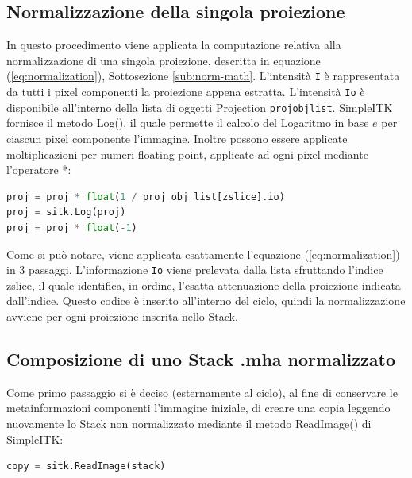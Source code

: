 \documentclass[a4paper,12pt, doubleside]{report}
\begin{document}
                
            \subsection{Normalizzazione della singola proiezione}
                \par
                    In questo procedimento viene applicata la computazione relativa alla normalizzazione di una singola proiezione, descritta in equazione (\ref{eq:normalization}), Sottosezione \ref{sub:norm-math}.
                    L'intensità \texttt{I} è rappresentata da tutti i pixel componenti la proiezione appena estratta. L'intensità \texttt{Io} è disponibile all'interno della lista di oggetti Projection \texttt{proj\textunderscore obj\textunderscore list}. SimpleITK fornisce il metodo Log()\cite{sitk-log}, il quale permette il calcolo del Logaritmo in base $e$ per ciascun pixel componente l'immagine. Inoltre possono essere applicate moltiplicazioni per numeri floating point, applicate ad ogni pixel mediante l'operatore *:
                    \begin{lstlisting}[language=python, frame=bt]
proj = proj * float(1 / proj_obj_list[zslice].io)
proj = sitk.Log(proj)
proj = proj * float(-1)
                    \end{lstlisting} 
                    
                    Come si può notare, viene applicata esattamente l'equazione (\ref{eq:normalization}) in 3 passaggi. L'informazione \texttt{Io} viene prelevata dalla lista sfruttando l'indice zslice, il quale identifica, in ordine, l'esatta attenuazione della proiezione indicata dall'indice. Questo codice è inserito all'interno del ciclo, quindi la normalizzazione avviene per ogni proiezione inserita nello Stack.
                             
            \subsection{Composizione di uno Stack .mha normalizzato}
                \par
                    Come primo passaggio si è deciso (esternamente al ciclo), al fine di conservare le metainformazioni componenti l'immagine iniziale, di creare una copia leggendo nuovamente lo Stack non normalizzato mediante il metodo ReadImage() di SimpleITK:
                   
                    \begin{lstlisting}[language=python, frame=bt]
copy = sitk.ReadImage(stack)
                    \end{lstlisting} 
                    
\end{document}
